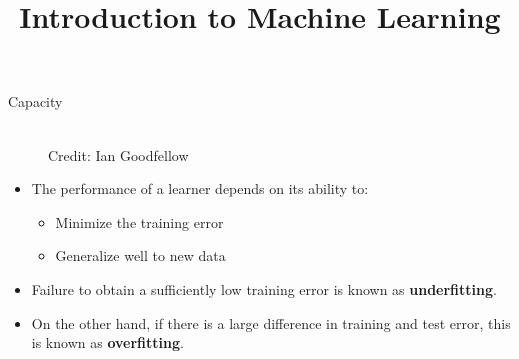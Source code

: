\documentclass[11pt,compress,t,notes=noshow, xcolor=table]{beamer}
\title{Introduction to Machine Learning}
\date{}
\begin{document}



\begin{vbframe} {Capacity}
  \begin{figure}
    \centering
      \tiny{\\ Credit: Ian Goodfellow}
  \end{figure}
  \vspace{-0.3cm}
  \begin{itemize}
    \item The performance of a learner depends on its ability to:
    \begin{itemize}
      \item Minimize the training error
      \item Generalize well to new data
    \end{itemize}
    \item Failure to obtain a sufficiently low training error is known as \textbf{underfitting}.
    \item On the other hand, if there is a large difference in training and test error, this is known as \textbf{overfitting}.
  \end{itemize}
  \framebreak


\end{vbframe}
\end{document}
